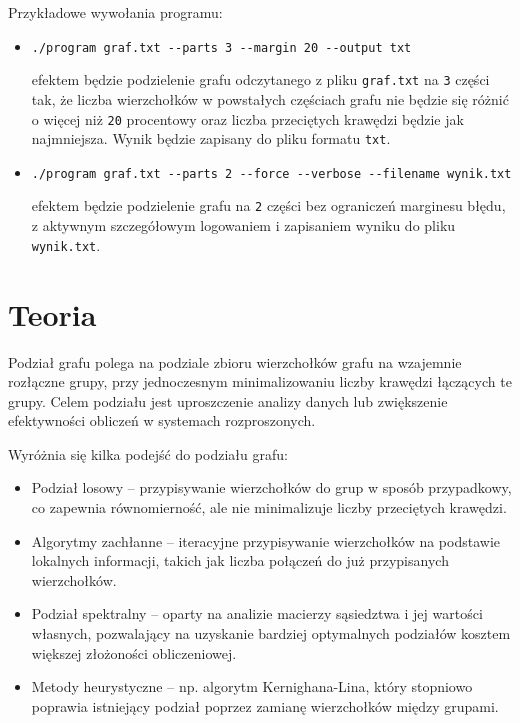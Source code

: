 \documentclass[]{article}
\begin{document}
Przykładowe wywołania programu:

\begin{itemize}
\item
  \texttt{./program\ graf.txt -\/-parts\ 3\ -\/-margin\ 20\ -\/-output\ txt}
  
  efektem będzie podzielenie grafu odczytanego z pliku \texttt{graf.txt} na \texttt{3} części tak, że liczba wierzchołków w powstałych częściach grafu nie będzie się różnić o więcej niż \texttt{20} procentowy oraz liczba przeciętych krawędzi będzie jak najmniejsza. Wynik będzie zapisany do pliku formatu \texttt{txt}.
\item
  \texttt{./program\ graf.txt -\/-parts\ 2\ -\/-force\ -\/-verbose\ -\/-filename\ wynik.txt}
  
  efektem będzie podzielenie grafu na \texttt{2} części bez ograniczeń marginesu błędu, z aktywnym szczegółowym logowaniem i zapisaniem wyniku do pliku \texttt{wynik.txt}.
\end{itemize}

\section{Teoria}\label{header-n279}
Podział grafu polega na podziale zbioru wierzchołków grafu na wzajemnie rozłączne grupy, przy jednoczesnym minimalizowaniu liczby krawędzi łączących te grupy. Celem podziału jest uproszczenie analizy danych lub zwiększenie efektywności obliczeń w systemach rozproszonych.

Wyróżnia się kilka podejść do podziału grafu:
\begin{itemize}
    \item 
    Podział losowy – przypisywanie wierzchołków do grup w sposób przypadkowy, co zapewnia równomierność, ale nie minimalizuje liczby przeciętych krawędzi.

    \item 
    Algorytmy zachłanne – iteracyjne przypisywanie wierzchołków na podstawie lokalnych informacji, takich jak liczba połączeń do już przypisanych wierzchołków.

    \item 
    Podział spektralny – oparty na analizie macierzy sąsiedztwa i jej wartości własnych, pozwalający na uzyskanie bardziej optymalnych podziałów kosztem większej złożoności obliczeniowej.

    \item 
    Metody heurystyczne – np. algorytm Kernighana-Lina, który stopniowo poprawia istniejący podział poprzez zamianę wierzchołków między grupami.
\end{itemize}
\end{document}
